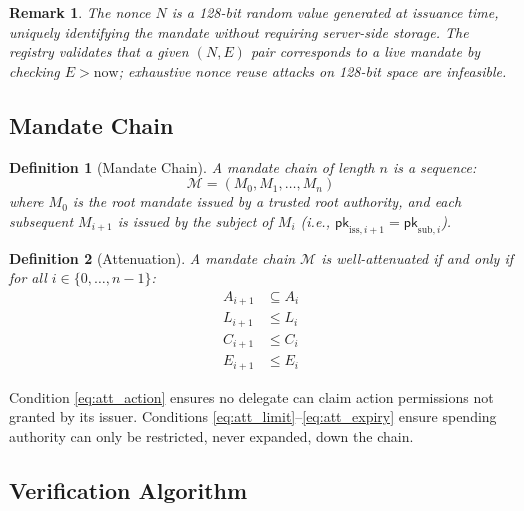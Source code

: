 \documentclass[conference]{IEEEtran}
\newtheorem{definition}{Definition}
\newtheorem{remark}{Remark}
\newcommand{\pk}{\mathsf{pk}}
\begin{document}
\begin{remark}
The nonce $N$ is a 128-bit random value generated at
issuance time, uniquely identifying the mandate without
requiring server-side storage. The registry validates that
a given $(N, E)$ pair corresponds to a live mandate by
checking $E > \text{now}$; exhaustive nonce reuse attacks
on 128-bit space are infeasible.
\end{remark}

\subsection{Mandate Chain}

\begin{definition}[Mandate Chain]
\label{def:chain}
A mandate chain of length $n$ is a sequence:
\begin{equation}
  \mathcal{M} = (M_0, M_1, \ldots, M_n)
\end{equation}
where $M_0$ is the \emph{root mandate} issued by a trusted
root authority, and each subsequent $M_{i+1}$ is issued by
the subject of $M_i$ (i.e., $\pk_{\text{iss},i+1} =
\pk_{\text{sub},i}$).
\end{definition}

\begin{definition}[Attenuation]
\label{def:attenuation}
A mandate chain $\mathcal{M}$ is \emph{well-attenuated} if
and only if for all $i \in \{0, \ldots, n-1\}$:
\begin{align}
  A_{i+1} &\subseteq A_i
    \label{eq:att_action} \\
  L_{i+1} &\leq L_i
    \label{eq:att_limit} \\
  C_{i+1} &\leq C_i
    \label{eq:att_ceiling} \\
  E_{i+1} &\leq E_i
    \label{eq:att_expiry}
\end{align}
\end{definition}

Condition \eqref{eq:att_action} ensures no delegate can
claim action permissions not granted by its issuer.
Conditions \eqref{eq:att_limit}--\eqref{eq:att_expiry}
ensure spending authority can only be restricted, never
expanded, down the chain.

\subsection{Verification Algorithm}
\end{document}
